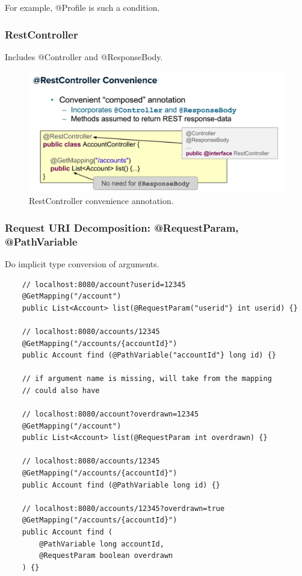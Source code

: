 \documentclass{scrartcl}
\begin{document}
For example, @Profile is such a condition.

\subsubsection{RestController}

Includes @Controller and @ResponseBody.

\begin{figure}
    \centering
    \includegraphics[width=1\linewidth]{restcontroller}
    \caption{RestController convenience annotation.}
    \label{fig:restcontroller}
\end{figure}

\subsubsection{Request URI Decomposition: @RequestParam, @PathVariable}

Do implicit type conversion of arguments.

\begin{lstlisting}
    // localhost:8080/account?userid=12345
    @GetMapping("/account")
    public List<Account> list(@RequestParam("userid"} int userid) {}

    // localhost:8080/accounts/12345
    @GetMapping("/accounts/{accountId}")
    public Account find (@PathVariable("accountId"} long id) {}

    // if argument name is missing, will take from the mapping
    // could also have

    // localhost:8080/account?overdrawn=12345
    @GetMapping("/account")
    public List<Account> list(@RequestParam int overdrawn) {}

    // localhost:8080/accounts/12345
    @GetMapping("/accounts/{accountId}")
    public Account find (@PathVariable long id) {}

    // localhost:8080/accounts/12345?overdrawn=true
    @GetMapping("/accounts/{accountId}")
    public Account find (
        @PathVariable long accountId,
        @RequestParam boolean overdrawn
    ) {}



\end{lstlisting}
\end{document}
